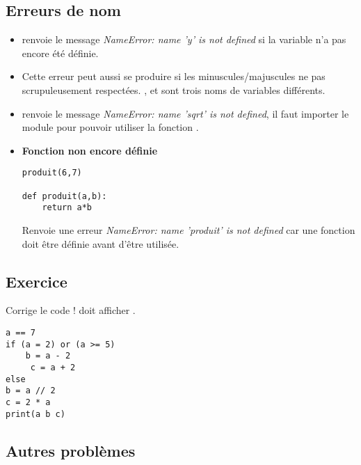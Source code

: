 \documentclass[11pt,class=report,crop=false]{standalone}
\begin{document}
\subsection{Erreurs de nom}

\begin{itemize}
  
  \item {} \quad \Python{} renvoie le message \emph{NameError: name 'y' is not defined} si la variable  n'a pas encore été définie.
  
  \item Cette erreur peut aussi se produire si les minuscules/majuscules ne pas scrupuleusement respectées. 
  ,  et  sont trois noms de variables différents.
  
  \item {} \quad \Python{} renvoie le message \emph{NameError: name 'sqrt' is not defined}, il faut importer le module  pour pouvoir utiliser la fonction .
  
   \item \textbf{Fonction non encore définie}  
\begin{lstlisting}
produit(6,7)

def produit(a,b):
    return a*b
\end{lstlisting}   
  
Renvoie une erreur \emph{NameError: name 'produit' is not defined} car une fonction doit être définie avant d'être utilisée.

  
\end{itemize}
  
\subsection{Exercice}

Corrige le code ! \Python{} doit afficher .

\begin{lstlisting}
a == 7
if (a = 2) or (a >= 5) 
    b = a - 2
     c = a + 2
else
b = a // 2
c = 2 * a
print(a b c)
\end{lstlisting}



\subsection{Autres problèmes}
\end{document}
